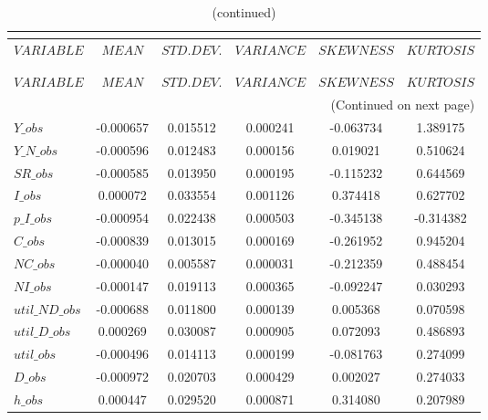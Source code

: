  
\begin{center}
\begin{longtable}{lccccc} 
\caption{MOMENTS OF SIMULATED VARIABLES}\\
 \label{Table:sim_moments}\\
\toprule 
$VARIABLE       $	 & 	 $            MEAN$	 & 	 $       STD. DEV.$	 & 	 $        VARIANCE$	 & 	 $        SKEWNESS$	 & 	 $        KURTOSIS$\\
\midrule \endfirsthead 
\caption{(continued)}\\
 \toprule \\ 
$VARIABLE       $	 & 	 $            MEAN$	 & 	 $       STD. DEV.$	 & 	 $        VARIANCE$	 & 	 $        SKEWNESS$	 & 	 $        KURTOSIS$\\
\midrule \endhead 
\midrule \multicolumn{6}{r}{(Continued on next page)} \\ \bottomrule \endfoot 
\bottomrule \endlastfoot 
$Y\_obs         $	 & 	       -0.000657	 & 	        0.015512	 & 	        0.000241	 & 	       -0.063734	 & 	        1.389175 \\ 
$Y\_N\_obs      $	 & 	       -0.000596	 & 	        0.012483	 & 	        0.000156	 & 	        0.019021	 & 	        0.510624 \\ 
$SR\_obs        $	 & 	       -0.000585	 & 	        0.013950	 & 	        0.000195	 & 	       -0.115232	 & 	        0.644569 \\ 
$I\_obs         $	 & 	        0.000072	 & 	        0.033554	 & 	        0.001126	 & 	        0.374418	 & 	        0.627702 \\ 
$p\_I\_obs      $	 & 	       -0.000954	 & 	        0.022438	 & 	        0.000503	 & 	       -0.345138	 & 	       -0.314382 \\ 
$C\_obs         $	 & 	       -0.000839	 & 	        0.013015	 & 	        0.000169	 & 	       -0.261952	 & 	        0.945204 \\ 
$NC\_obs        $	 & 	       -0.000040	 & 	        0.005587	 & 	        0.000031	 & 	       -0.212359	 & 	        0.488454 \\ 
$NI\_obs        $	 & 	       -0.000147	 & 	        0.019113	 & 	        0.000365	 & 	       -0.092247	 & 	        0.030293 \\ 
$util\_ND\_obs  $	 & 	       -0.000688	 & 	        0.011800	 & 	        0.000139	 & 	        0.005368	 & 	        0.070598 \\ 
$util\_D\_obs   $	 & 	        0.000269	 & 	        0.030087	 & 	        0.000905	 & 	        0.072093	 & 	        0.486893 \\ 
$util\_obs      $	 & 	       -0.000496	 & 	        0.014113	 & 	        0.000199	 & 	       -0.081763	 & 	        0.274099 \\ 
$D\_obs         $	 & 	       -0.000972	 & 	        0.020703	 & 	        0.000429	 & 	        0.002027	 & 	        0.274033 \\ 
$h\_obs         $	 & 	        0.000447	 & 	        0.029520	 & 	        0.000871	 & 	        0.314080	 & 	        0.207989 \\ 
\end{longtable}
 \end{center}
